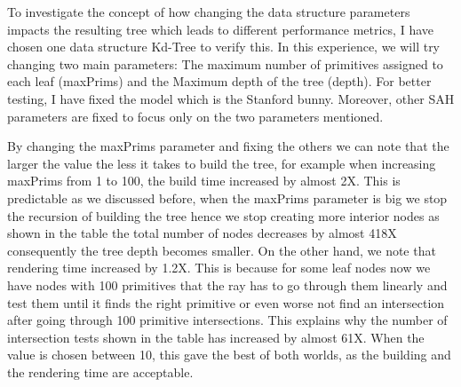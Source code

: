 \documentclass[11pt,a4paper]{article}
\begin{document}
To investigate the concept of how changing the data structure parameters impacts the resulting tree which leads to different performance metrics, I have chosen one data structure Kd-Tree to verify this. In this experience, we will try changing two main parameters: The maximum number of primitives assigned to each leaf (maxPrims) and the Maximum depth of the tree (depth). For better testing, I have fixed the model which is the Stanford bunny. Moreover, other SAH parameters are fixed to focus only on the two parameters mentioned. 
\\
\noindent

By changing the maxPrims parameter and fixing the others we can note that the larger the value the less it takes to build the tree, for example when increasing maxPrims from  1 to 100, the build time increased by almost 2X. This is predictable as we discussed before, when the maxPrims parameter is big we stop the recursion of building the tree hence we stop creating more interior nodes as shown in the table the total number of nodes decreases by almost 418X consequently the tree depth becomes smaller. On the other hand, we note that rendering time increased by 1.2X. This is because for some leaf nodes now we have nodes with 100 primitives that the ray has to go through them linearly and test them until it finds the right primitive or even worse not find an intersection after going through 100 primitive intersections. This explains why the number of intersection tests shown in the table has increased by almost  61X. When the value is chosen between 10, this gave the best of both worlds, as the building and the rendering time are acceptable. 
\end{document}

